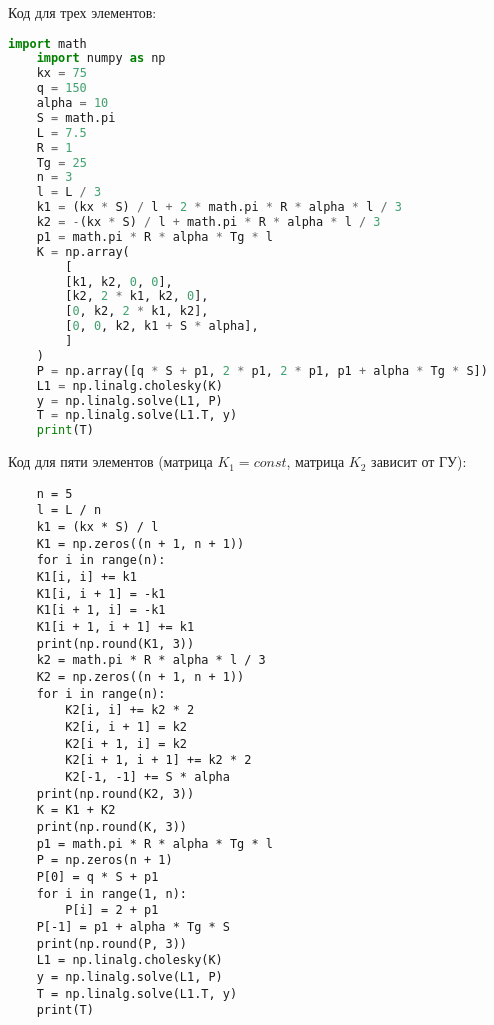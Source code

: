 \documentclass[a4paper, 12pt]{article}
\begin{document}
	Код для трех элементов:
	\begin{lstlisting}[language=Python]
	import math
	import numpy as np
	kx = 75
	q = 150
	alpha = 10
	S = math.pi
	L = 7.5
	R = 1
	Tg = 25
	n = 3
	l = L / 3
	k1 = (kx * S) / l + 2 * math.pi * R * alpha * l / 3
	k2 = -(kx * S) / l + math.pi * R * alpha * l / 3
	p1 = math.pi * R * alpha * Tg * l
	K = np.array(
		[
		[k1, k2, 0, 0],
		[k2, 2 * k1, k2, 0],
		[0, k2, 2 * k1, k2],
		[0, 0, k2, k1 + S * alpha],
		]
	)
	P = np.array([q * S + p1, 2 * p1, 2 * p1, p1 + alpha * Tg * S])
	L1 = np.linalg.cholesky(K)
	y = np.linalg.solve(L1, P)
	T = np.linalg.solve(L1.T, y)
	print(T)
	\end{lstlisting}
	
	\newpage
	Код для пяти элементов (матрица $K_1 = const$, матрица $K_2$ зависит от ГУ):
	\begin{lstlisting}
	n = 5
	l = L / n
	k1 = (kx * S) / l
	K1 = np.zeros((n + 1, n + 1))
	for i in range(n):
	K1[i, i] += k1
	K1[i, i + 1] = -k1
	K1[i + 1, i] = -k1
	K1[i + 1, i + 1] += k1
	print(np.round(K1, 3))
	k2 = math.pi * R * alpha * l / 3
	K2 = np.zeros((n + 1, n + 1))
	for i in range(n):
		K2[i, i] += k2 * 2
		K2[i, i + 1] = k2
		K2[i + 1, i] = k2
		K2[i + 1, i + 1] += k2 * 2
		K2[-1, -1] += S * alpha
	print(np.round(K2, 3))
	K = K1 + K2
	print(np.round(K, 3))
	p1 = math.pi * R * alpha * Tg * l
	P = np.zeros(n + 1)
	P[0] = q * S + p1
	for i in range(1, n):
		P[i] = 2 + p1
	P[-1] = p1 + alpha * Tg * S
	print(np.round(P, 3))
	L1 = np.linalg.cholesky(K)
	y = np.linalg.solve(L1, P)
	T = np.linalg.solve(L1.T, y)
	print(T)
	\end{lstlisting}
\end{document}
